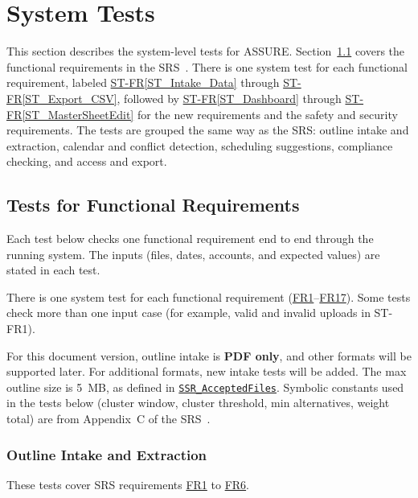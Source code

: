 \documentclass[12pt, titlepage]{article}
\newcommand{\stref}[1]{\hyperref[#1]{ST-FR\ref*{#1}}}
\newcommand{\halink}[1]{\href{https://github.com/shivyam/cas-course-optimization/blob/main/pdfs/HazardAnalysis/HazardAnalysis.pdf}{#1}}
\newcommand{\frlink}[1]{\href{https://github.com/shivyam/cas-course-optimization/blob/main/pdfs/SRS-IEEE/SRS.pdf}{FR#1}}
\begin{document}
\section{System Tests} \label{sec_SystemTests}

This section describes the system-level tests for ASSURE. Section~\ref{sec_SysFuncTests} covers the functional requirements in the SRS~\citep{TeamBVSH2026SRS}. There is one system test for each functional requirement, labeled \stref{ST_Intake_Data} through \stref{ST_Export_CSV}, followed by \stref{ST_Dashboard} through \stref{ST_MasterSheetEdit} for the new requirements and the safety and security requirements. The tests are grouped the same way as the SRS: outline intake and extraction, calendar and conflict detection, scheduling suggestions, compliance checking, and access and export.

\subsection{Tests for Functional Requirements} \label{sec_SysFuncTests}

Each test below checks one functional requirement end to end through the running system. The inputs (files, dates, accounts, and expected values) are stated in each test.

There is one system test for each functional requirement (\frlink{1}--\frlink{17}). Some tests check more than one input case (for example, valid and invalid uploads in ST-FR1).

For this document version, outline intake is \textbf{PDF only}, and other formats will be supported later. For additional formats, new intake tests will be added. The max outline size is 5~MB, as defined in \halink{\texttt{SSR\_AcceptedFiles}}. Symbolic constants used in the tests below (cluster window, cluster threshold, min alternatives, weight total) are from Appendix~C of the SRS~\citep{TeamBVSH2026SRS}. 

\subsubsection{Outline Intake and Extraction}

These tests cover SRS requirements \frlink{1} to \frlink{6}.
\end{document}
